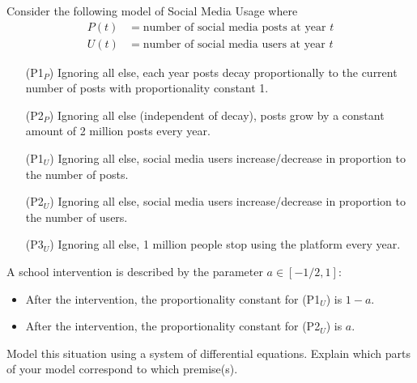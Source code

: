 \documentclass{workbook}
\begin{document}
\begin{slide}
	\question
	Consider the following model of Social Media Usage where
	\begin{align*}
		P(t) &= \text{number of social media posts at year $t$}\\
		U(t) &= \text{number of social media users at year $t$}
	\end{align*}
	\begin{itemize}
		\item[(P1$_P$)] Ignoring all else, each year posts decay proportionally to the current number of posts with proportionality constant 1.
		\item[(P2$_P$)] Ignoring all else (independent of decay), posts grow by a constant amount of 2 million posts every year.
		\item[(P1$_U$)] Ignoring all else, social media users increase/decrease in proportion to the number of posts.
		\item[(P2$_U$)] Ignoring all else, social media users increase/decrease in proportion to the number of users.
		\item[(P3$_U$)] Ignoring all else, 1 million people stop using the platform every year.
	\end{itemize}

	\bigskip
	A school intervention is described by the parameter $a\in [-1/2, 1]$:
	\begin{itemize}
		\item After the intervention, the proportionality constant for (P1$_U$) is $1-a$.
		\item After the intervention, the proportionality constant for (P2$_U$) is $a$.
	\end{itemize}

	\begin{parts}
		\item Model this situation using a system of differential equations. Explain
			which parts of your model correspond to which premise(s).
	\end{parts}
\end{slide}
\end{document}
